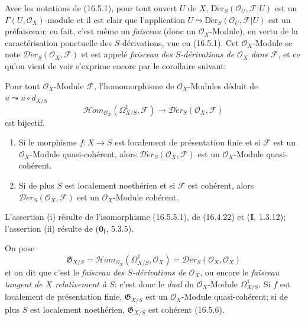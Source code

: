 \begin{env}[16.5.4]
Avec les notations de (16.5.1), pour tout ouvert $U$ de $X$,
$\operatorname{D\acute{e}r}_S(\mathcal{O}_U,\mathscr{F}|U)$ est un
$\Gamma(U,\mathcal{O}_X)$-module et il est clair que l'application
$U\leadsto\operatorname{D\acute{e}r}_S(\mathcal{O}_U,\mathscr{F}|U)$ est un
préfaisceau; en fait, c'est même un \emph{faisceau} (donc un
$\mathcal{O}_X$-Module), en vertu de la caractérisation ponctuelle des
$S$-dérivations, vue en (16.5.1). Cet $\mathcal{O}_X$-Module se note
$\mathscr{D}\!\acute{e}r_S(\mathcal{O}_X,\mathscr{F})$ et est appelé
\emph{faisceau des $S$-dérivations de $\mathcal{O}_X$ dans $\mathscr{F}$}, et
ce qu'on vient de voir s'exprime encore par le corollaire suivant:
\end{env}

\begin{corollary}[16.5.5]
\label{IV.16.5.5}
Pour tout $\mathcal{O}_X$-Module $\mathscr{F}$, l'homomorphisme de
$\mathcal{O}_X$-Modules déduit de $u\leadsto u\circ d_{X/S}$
\[
  \mathscr{H}\!om_{\mathcal{O}_X}(\varOmega_{X/S}^1,\mathscr{F})
  \longrightarrow
  \mathscr{D}\!\acute{e}r_S(\mathcal{O}_X,\mathscr{F})
  \tag{16.5.5.1}
  \label{IV.16.5.5.1}
\]
est bijectif.
\end{corollary}

\begin{corollary}[16.5.6]
\label{IV.16.5.6}
\begin{enumerate}
\item[\textup{(i)}] Si le morphisme $f:X\to S$ est localement de présentation finie et
si $\mathscr{F}$ est un $\mathcal{O}_X$-Module quasi-cohérent, alors
$\mathscr{D}\!\acute{e}r_S(\mathcal{O}_X,\mathscr{F})$ est un
$\mathcal{O}_X$-Module quasi-cohérent.
\item[\textup{(ii)}] Si de plus $S$ est localement noethérien et si $\mathscr{F}$ est
cohérent, alors $\mathscr{D}\!\acute{e}r_S(\mathcal{O}_X,\mathscr{F})$ est un
$\mathcal{O}_X$-Module cohérent.
\end{enumerate}
\end{corollary}

L'assertion (i) résulte de l'isomorphisme (16.5.5.1), de (16.4.22) et
(\textbf{I}, 1.3.12); l'assertion (ii) résulte de ($\mathbf{0}_{\mathrm I}$, 5.3.5).

\begin{env}[16.5.7]
On pose
\[
  \mathfrak{G}_{X/S}=
  \mathscr{H}\!om_{\mathcal{O}_X}(\varOmega_{X/S}^1,\mathcal{O}_X)
  =\mathscr{D}\!\acute{e}r_S(\mathcal{O}_X,\mathcal{O}_X)
  \tag{16.5.7.1}
  \label{IV.16.5.7.1}
\]
et on dit que c'est le \emph{faisceau des $S$-dérivations de
$\mathcal{O}_X$}, ou encore le \emph{faisceau tangent de $X$ relativement à
$S$}: c'est donc le \emph{dual} du $\mathcal{O}_X$-Module
$\varOmega_{X/S}^1$. Si $f$ est localement de présentation
finie, $\mathfrak{G}_{X/S}$ est un $\mathcal{O}_X$-Module quasi-cohérent; si
de plus $S$ est localement noethérien, $\mathfrak{G}_{X/S}$ est cohérent
(16.5.6).
\end{env}

